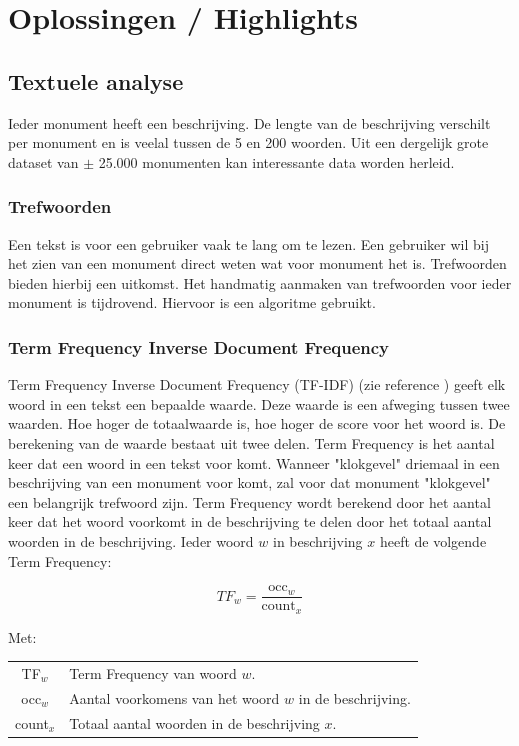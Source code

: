 \documentclass[a4paper,10pt]{article}
\begin{document}
%
%
%
%
\section{Oplossingen / Highlights}
	\subsection{Textuele analyse}
	Ieder monument heeft een beschrijving. De lengte van de beschrijving verschilt per monument en is veelal tussen de 5 en 200 woorden. Uit een dergelijk grote dataset van $\pm$ 25.000 monumenten kan interessante data worden herleid.

		\subsubsection{Trefwoorden}
		Een tekst is voor een gebruiker vaak te lang om te lezen. Een gebruiker wil bij het zien van een monument direct weten wat voor monument het is. Trefwoorden bieden hierbij een uitkomst. Het handmatig aanmaken van trefwoorden voor ieder monument is tijdrovend. Hiervoor is een algoritme gebruikt.
		
		\subsubsection{Term Frequency Inverse Document Frequency}
		Term Frequency Inverse Document Frequency (TF-IDF) (zie reference \cite{1}) geeft elk woord in een tekst een bepaalde waarde. Deze waarde is een afweging tussen twee waarden. Hoe hoger de totaalwaarde is, hoe hoger de score voor het woord is. De berekening van de waarde bestaat uit twee delen. Term Frequency is het aantal keer dat een woord in een tekst voor komt. Wanneer "klokgevel" driemaal in een beschrijving van een monument voor komt, zal voor dat monument "klokgevel" een belangrijk trefwoord zijn. Term Frequency wordt berekend door het aantal keer dat het woord voorkomt in de beschrijving te delen door het totaal aantal woorden in de beschrijving. Ieder woord $w$ in beschrijving $x$ heeft de volgende Term Frequency:
		
		\begin{equation}
			TF_w = \frac{\text{occ}_w}{\text{count}_x}
		\end{equation}
		
		\noindent Met:
		\begin{center}
			\begin{tabular}{ c | l }
				TF$_w$ & Term Frequency van woord $w$. \\
			  	occ$_w$ & Aantal voorkomens van het woord $w$ in de beschrijving. \\
			  	count$_x$ & Totaal aantal woorden in de beschrijving $x$. 
			\end{tabular}
		\end{center}
		
\end{document}
